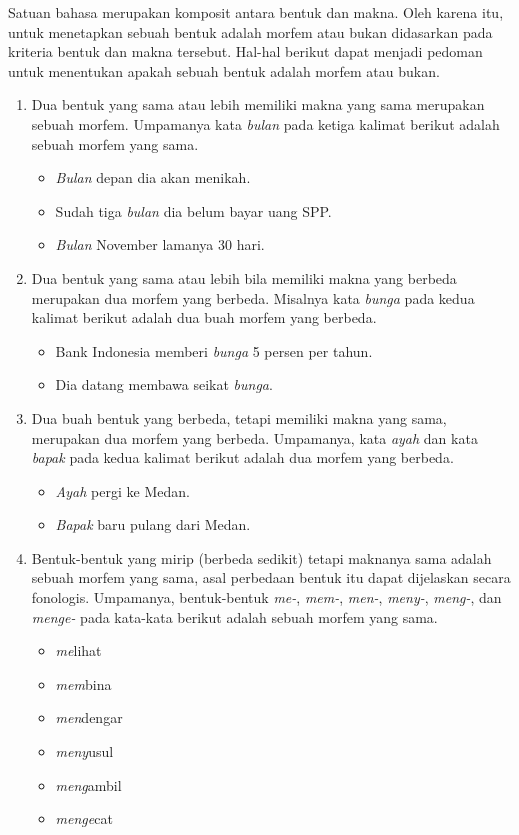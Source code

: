 Satuan bahasa merupakan komposit antara bentuk dan makna\cite{chaer:08:morfologi}. Oleh karena itu, untuk menetapkan sebuah bentuk adalah morfem atau bukan didasarkan pada kriteria bentuk dan makna tersebut. Hal-hal berikut dapat menjadi pedoman untuk menentukan apakah sebuah bentuk adalah morfem atau bukan. 

\begin{enumerate}
	\item Dua bentuk yang sama atau lebih memiliki makna yang sama merupakan sebuah morfem. Umpamanya kata \textit{bulan} pada ketiga kalimat berikut adalah sebuah morfem yang sama.
	\begin{itemize}
		\item \textit{Bulan} depan dia akan menikah.
		\item Sudah tiga \textit{bulan} dia belum bayar uang SPP.
		\item \textit{Bulan} November lamanya 30 hari.
	\end{itemize}
	
	\item Dua bentuk yang sama atau lebih bila memiliki makna yang berbeda merupakan dua morfem yang berbeda. Misalnya kata \textit{bunga} pada kedua kalimat berikut adalah dua buah morfem yang berbeda.
	\begin{itemize}
		\item Bank Indonesia memberi \textit{bunga} 5 persen per tahun.
		\item Dia datang membawa seikat \textit{bunga}.
	\end{itemize}
	
	\item Dua buah bentuk yang berbeda, tetapi memiliki makna yang sama, merupakan dua morfem yang berbeda. Umpamanya, kata \textit{ayah} dan kata \textit{bapak} pada kedua kalimat berikut adalah dua morfem yang berbeda.
	\begin{itemize}
		\item \textit{Ayah} pergi ke Medan.
		\item \textit{Bapak} baru pulang dari Medan.
	\end{itemize}
	
	\item Bentuk-bentuk yang mirip (berbeda sedikit) tetapi maknanya sama adalah sebuah morfem yang sama, asal perbedaan bentuk itu dapat dijelaskan secara fonologis. Umpamanya, bentuk-bentuk \textit{me-}, \textit{mem-}, \textit{men-}, \textit{meny-}, \textit{meng-}, dan \textit{menge-} pada kata-kata berikut adalah sebuah morfem yang sama.
	\begin{itemize}
		\item \textit{me}lihat
		\item \textit{mem}bina
		\item \textit{men}dengar
		\item \textit{meny}usul
		\item \textit{meng}ambil
		\item \textit{menge}cat
	\end{itemize}
	

\end{enumerate}
